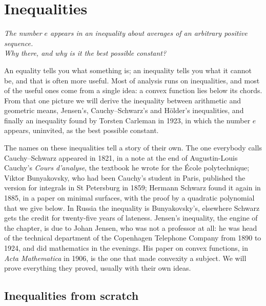 \chapter{Inequalities}

\begin{center}\itshape
The number $e$ appears in an inequality about averages of an arbitrary positive sequence.\\
Why there, and why is it the best possible constant?
\end{center}

An equality tells you what something is; an inequality tells you what it cannot be, and that is often more useful. Most of analysis runs on
inequalities, and most of the useful ones come from a single idea: a convex function lies below its chords. From that one picture we will derive the
inequality between arithmetic and geometric means, Jensen's, Cauchy--Schwarz's and H\"older's inequalities, and finally an inequality found by Torsten Carleman in
1923, in which the number $e$ appears, uninvited, as the best possible constant.

The names on these inequalities tell a story of their own. The one everybody calls Cauchy--Schwarz appeared in 1821, in a note at the end of
Augustin-Louis Cauchy's \emph{Cours d'analyse}, the textbook he wrote for the \'Ecole polytechnique; Viktor Bunyakovsky, who had been Cauchy's
student in Paris, published the version for integrals in St Petersburg in 1859; Hermann Schwarz found it again in 1885, in a paper on minimal
surfaces, with the proof by a quadratic polynomial that we give below. In Russia the inequality is Bunyakovsky's, elsewhere Schwarz gets the
credit for twenty-five years of lateness. Jensen's inequality, the engine of the chapter, is due to Johan Jensen, who was not a professor at all:
he was head of the technical department of the Copenhagen Telephone Company from 1890 to 1924, and did mathematics in the evenings. His paper on
convex functions, in \emph{Acta Mathematica} in 1906, is the one that made convexity a subject. We will prove everything they proved, usually with
their own ideas.


\section{Inequalities from scratch}

